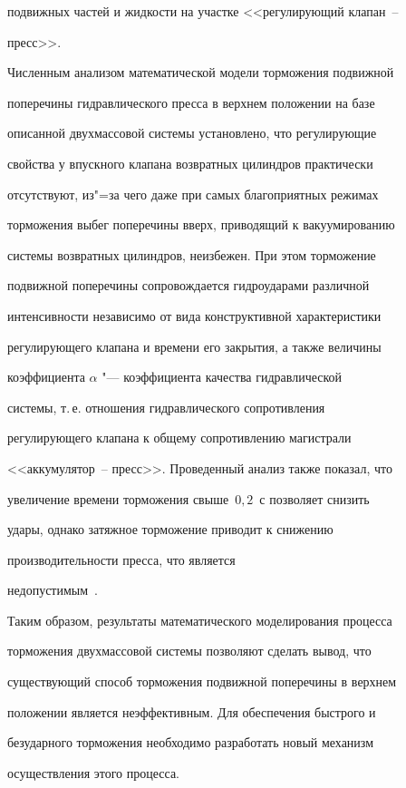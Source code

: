 подвижных частей и жидкости на участке <<регулирующий клапан~--

пресс>>.



Численным анализом математической модели торможения подвижной

поперечины гидравлического пресса в верхнем положении на базе

описанной двухмассовой системы установлено, что регулирующие

свойства у впускного клапана возвратных цилиндров практически

отсутствуют, из"=за чего даже при самых благоприятных режимах

торможения выбег поперечины вверх, приводящий к вакуумированию

системы возвратных цилиндров, неизбежен. При этом торможение

подвижной поперечины сопровождается гидроударами различной

интенсивности независимо от вида конструктивной характеристики

регулирующего клапана и времени его закрытия, а также величины

коэффициента $\alpha$ "--- коэффициента качества гидравлической

системы, т.\,е. отношения гидравлического сопротивления

регулирующего клапана к общему сопротивлению магистрали

<<аккумулятор~-- пресс>>. Проведенный анализ также показал, что

увеличение времени торможения свыше~$0,2$~с позволяет снизить

удары, однако затяжное торможение приводит к снижению

производительности пресса, что является

недопустимым~\cite{korchak:bib:SamGTU}.



Таким образом, результаты математического моделирования процесса

торможения двухмассовой системы позволяют сделать вывод, что

существующий способ торможения подвижной поперечины в верхнем

положении является неэффективным. Для обеспечения быстрого и

безударного торможения необходимо разработать новый механизм

осуществления этого процесса.



